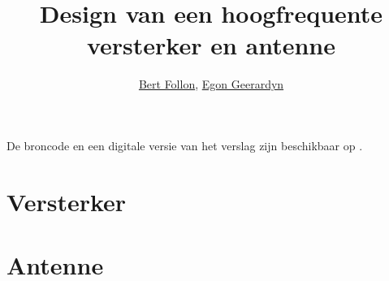 \documentclass[pdftex,a4paper]{article}
\title{Design van een hoogfrequente versterker en antenne}
\author{\href{mailto:Bert.Follon@vub.ac.be}{Bert Follon},
         \href{mailto:Egon.Geerardyn@vub.ac.be}{Egon Geerardyn}}
\date{\datum}
\begin{document}
  \maketitlepage
  \newpage
  \tableofcontents
  \listoffigures
  \listoftables
  De broncode en een digitale versie van het verslag zijn beschikbaar op \cite{github}.
  \newpage
  \part{Versterker}
  \label{sec:Amp}
    
    

  \newpage
  \part{Antenne}
  \label{sec:AE}

    
    
  \newpage
  
  
  
  
\end{document}
